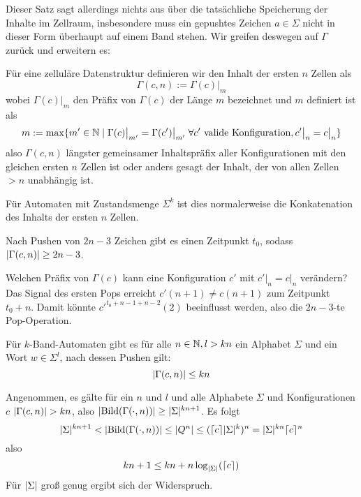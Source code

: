 \documentclass{article}
\begin{document}
Dieser Satz sagt allerdings nichts aus über die tatsächliche Speicherung der Inhalte im Zellraum, insbesondere muss ein gepushtes Zeichen $a \in \Sigma$ nicht in dieser Form überhaupt auf einem Band stehen. Wir greifen deswegen auf $\Gamma$ zurück und erweitern es:

\begin{definition}
    Für eine zelluläre Datenstruktur definieren wir den Inhalt der ersten $n$ Zellen als
        \[ \Gamma(c,n) := \Gamma(c) \big|_m \]
    wobei $\Gamma(c) \big|_m$ den Präfix von $\Gamma(c)$ der Länge $m$ bezeichnet und $m$ definiert ist als
    \[ m := \max \{m' \in \mathbb{N} \mid \Gamma(c) \big|_{m'} = \Gamma(c') \big|_{m'} \;\forall c' \text{ valide Konfiguration}, c' \big|_n = c \big|_n \} \]
    also $\Gamma(c,n)$ längster gemeinsamer Inhaltspräfix aller Konfigurationen mit den gleichen ersten $n$ Zellen ist oder anders gesagt der Inhalt, der von allen Zellen $> n$ unabhängig ist.

    Für Automaten mit Zustandsmenge $\Sigma^k$ ist dies normalerweise die Konkatenation des Inhalts der ersten $n$ Zellen.
\end{definition}

\begin{satz}
    \label{thm:locontent}
    Nach Pushen von $2n-3$ Zeichen gibt es einen Zeitpunkt $t_0$, sodass $\lvert\Gamma(c,n)\rvert \geq 2n-3$.
    \begin{beweis}
        Welchen Präfix von $\Gamma(c)$ kann eine Konfiguration $c'$ mit $c' \big|_n = c \big|_n$ verändern? Das Signal des ersten Pops erreicht $c'(n+1) \neq c(n+1)$ zum Zeitpunkt $t_0+n$. Damit könnte $c'^{t_0+n-1+n-2}(2)$ beeinflusst werden, also die $2n-3$-te Pop-Operation.
    \end{beweis}
\end{satz}

\begin{satz}
    \label{cor:spacesize}
    Für $k$-Band-Automaten gibt es für alle $n \in \mathbb{N}, l > kn$ ein Alphabet $\Sigma$ und ein Wort $w \in \Sigma^l$, nach dessen Pushen gilt:
    \[ \lvert\Gamma(c,n)\rvert \leq kn \]
    \begin{beweis}
        Angenommen, es gälte für ein $n$ und $l$ und alle Alphabete $\Sigma$ und Konfigurationen $c$ $\lvert\Gamma(c,n)\rvert > kn$, also $\lvert\text{Bild}(\Gamma(\cdot,n))\rvert \geq \lvert\Sigma\rvert^{kn+1}$.
        Es folgt
        \[ \lvert\Sigma\rvert^{kn+1} < \lvert\text{Bild}(\Gamma(\cdot,n))\rvert \leq \lvert Q^n\rvert \leq (\lceil c\rceil\lvert\Sigma\rvert^k)^n = \lvert\Sigma\rvert^{kn} \lceil c\rceil^n \]
        also
        \[ kn + 1 \leq kn + n \log_{\lvert\Sigma\rvert}(\lceil c\rceil) \]
        Für $\lvert\Sigma\rvert$ groß genug ergibt sich der Widerspruch.
    \end{beweis}
\end{satz}
\end{document}
